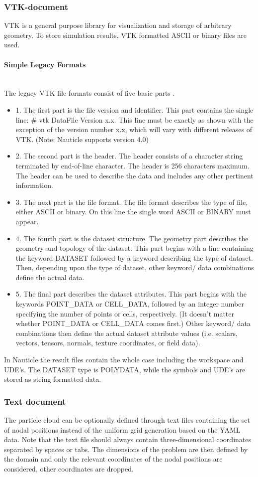 \documentclass[a4paper,12pt,openany]{book}
\newcommand{\myparagraph}[1]{\paragraph{#1}\mbox{}\\\noindent}
\theoremstyle{break}
\begin{document}
\subsubsection{VTK-document}
VTK is a general purpose library for visualization and storage of arbitrary geometry. To store simulation results, VTK formatted ASCII or binary files are used.
\myparagraph{Simple Legacy Formats}
The legacy VTK file formats consist of five basic parts \cite{VTK_format}.
\begin{itemize}
\item 1. The first part is the file version and identifier. This part contains the single line: \# vtk DataFile Version x.x. This line must be exactly as shown with the exception of the version number x.x, which will vary with different releases of VTK. (Note: Nauticle supports version 4.0) 
\item 2. The second part is the header. The header consists of a character string terminated by end-of-line character. The header is 256 characters maximum. The header can be used to describe the data and includes any other pertinent information. 
\item 3. The next part is the file format. The file format describes the type of file, either ASCII or binary. On this line the single word ASCII or BINARY must appear. 
\item 4. The fourth part is the dataset structure. The geometry part describes the geometry and topology of the dataset. This part begins with a line containing the keyword DATASET followed by a keyword describing the type of dataset. Then, depending upon the type of dataset, other keyword/ data combinations define the actual data.
\item 5. The final part describes the dataset attributes. This part begins with the keywords POINT\_DATA or CELL\_DATA, followed by an integer number specifying the number of points or cells, respectively. (It doesn't matter whether POINT\_DATA or CELL\_DATA comes first.) Other keyword/ data combinations then define the actual dataset attribute values (i.e. scalars, vectors, tensors, normals, texture coordinates, or field data). 
\end{itemize}
In Nauticle the result files contain the whole case including the workspace and UDE's. The DATASET type is POLYDATA, while the symbols and UDE's are stored as string formatted data.
\subsubsection{Text document}
The particle cloud can be optionally defined through text files containing the set of nodal positions instead of the uniform grid generation based on the YAML data. Note that the text file should always contain three-dimensional coordinates separated by spaces or tabs. The dimensions of the problem are then defined by the domain and only the relevant coordinates of the nodal positions are considered, other coordinates are dropped.
\end{document}
